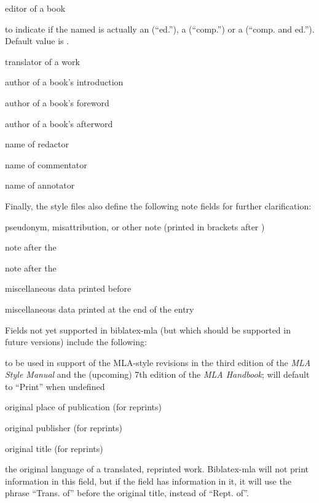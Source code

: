 \documentclass{ltxdockit}[2011/03/25]
\newenvironment*{optionslistNOT}
  {\list{}{%
     \setlength{\labelwidth}{\marglistwidth}%
     \setlength{\labelsep}{\marglistsep}%
     \setlength{\leftmargin}{50pt}%
     \renewcommand*{\makelabel}[1]{\hss\marglistfont##1}}%
   \def\optionitem##1{%
     \item[{\textbf{##1}}]}}
  {\endlist}
\begin{document}
\begin{optionslistNOT}
	\optionitem{editor}
	editor of a book

	\optionitem{editortype}
	to indicate if the named  is actually an  (``ed.''), a  (``comp.'') or a  (``comp. and ed.''). Default value is .

	\optionitem{translator}
	translator of a work

	\optionitem{introduction}
	author of a book's introduction

	\optionitem{foreword}
	author of a book's foreword

	\optionitem{afterword}
	author of a book's afterword

	\optionitem{redactor}
	name of redactor

	\optionitem{commentator}
	name of commentator

	\optionitem{annotator}
	name of annotator

\end{optionslistNOT}

Finally, the style files also define the following note fields for further clarification:

\begin{optionslistNOT}
	\optionitem{nameaddon}
	pseudonym, misattribution, or other note (printed in brackets after )

	\optionitem{booktitleaddon}
	note after the 

	\optionitem{maintitleaddon}
	note after the 

	\optionitem{note}
	miscellaneous data printed before 

	\optionitem{addendum}
	miscellaneous data printed at the end of the entry

\end{optionslistNOT}

Fields not yet supported in biblatex-mla (but which should be supported in future versions) include the following:

\begin{optionslistNOT}
	\optionitem{howpublished}
	to be used in support of the MLA-style revisions in the third edition of the \emph{MLA Style Manual} and the (upcoming) 7th edition of the \emph{MLA Handbook}; will default to ``Print''  when undefined

	\optionitem{origlocation}
	original place of publication (for reprints)

	\optionitem{origpublisher}
	original publisher (for reprints)

	\optionitem{origtitle}
	original title (for reprints)

	\optionitem{origlanguage}
	the original language of a translated, reprinted work. Biblatex-mla will not print information in this field, but if the field has information in it, it will use the phrase ``Trans. of''  before the original title, instead of ``Rept. of''.

\end{optionslistNOT}
\end{document}
